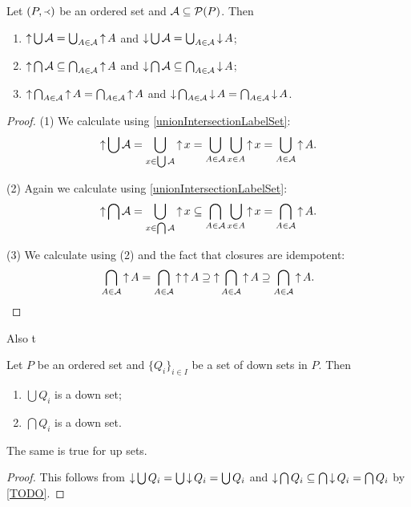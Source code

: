 \begin{corollary} \label{upDownsetUnionIntersection}
Let $\left( P,\Yleft \right)$ be an ordered set and $\mathcal{A}\subseteq \operatorname{\mathcal{P}}(P)$. Then
\begin{enumerate}
\item $\operatorname{\uparrow} \bigcup \mathcal{A} = \bigcup_{A\in \mathcal{A}} \operatorname{\uparrow} A$ and $\operatorname{\downarrow} \bigcup \mathcal{A} = \bigcup_{A\in \mathcal{A}} \operatorname{\downarrow} A$;
\item $\operatorname{\uparrow} \bigcap \mathcal{A} \subseteq \bigcap_{A\in \mathcal{A}} \operatorname{\uparrow} A$ and $\operatorname{\downarrow} \bigcap \mathcal{A} \subseteq \bigcap_{A\in \mathcal{A}} \operatorname{\downarrow} A$;
\item $\operatorname{\uparrow} \bigcap_{A\in \mathcal{A}} \operatorname{\uparrow} A = \bigcap_{A\in \mathcal{A}} \operatorname{\uparrow} A$ and $\operatorname{\downarrow} \bigcap_{A\in \mathcal{A}} \operatorname{\downarrow} A = \bigcap_{A\in \mathcal{A}} \operatorname{\downarrow} A$.
\end{enumerate}
\end{corollary}
\begin{proof}
(1) We calculate using \ref{unionIntersectionLabelSet}:
\[ \operatorname{\uparrow} \bigcup \mathcal{A} = \bigcup_{x\in \bigcup\mathcal{A}} \operatorname{\uparrow} x = \bigcup_{A\in \mathcal{A}}\bigcup_{x\in A}\operatorname{\uparrow} x = \bigcup_{A\in \mathcal{A}} \operatorname{\uparrow} A. \]

(2) Again we calculate using \ref{unionIntersectionLabelSet}:
\[ \operatorname{\uparrow} \bigcap \mathcal{A} = \bigcup_{x\in \bigcap\mathcal{A}} \operatorname{\uparrow} x \subseteq \bigcap_{A\in \mathcal{A}}\bigcup_{x\in A}\operatorname{\uparrow} x = \bigcap_{A\in \mathcal{A}} \operatorname{\uparrow} A. \]

(3) We calculate using (2) and the fact that closures are idempotent:
\[ \bigcap_{A\in \mathcal{A}} \operatorname{\uparrow} A = \bigcap_{A\in \mathcal{A}} \operatorname{\uparrow}\operatorname{\uparrow} A \supseteq \operatorname{\uparrow} \bigcap_{A\in \mathcal{A}} \operatorname{\uparrow} A \supseteq \bigcap_{A\in \mathcal{A}} \operatorname{\uparrow} A. \]
\end{proof}
Also t
\begin{corollary} \label{unionIntersectionDownUpSets}
Let $P$ be an ordered set and $\{Q_i\}_{i\in I}$ be a set of down sets in $P$. Then
\begin{enumerate}
\item $\bigcup Q_i$ is a down set;
\item $\bigcap Q_i$ is a down set.
\end{enumerate}
The same is true for up sets.
\end{corollary}
\begin{proof}
This follows from $\operatorname{\downarrow} \bigcup Q_i = \bigcup \operatorname{\downarrow} Q_i = \bigcup Q_i$ and $\operatorname{\downarrow} \bigcap Q_i \subseteq \bigcap \operatorname{\downarrow} Q_i = \bigcap Q_i$ by \ref{TODO}.
\end{proof}

